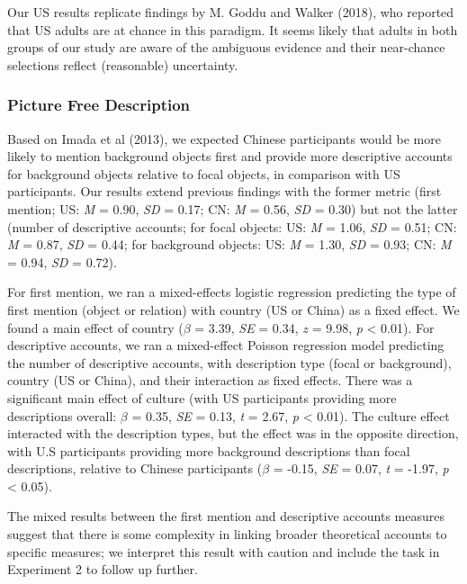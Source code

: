 \documentclass[
  man,floatsintext]{apa6}
\begin{document}
Our US results replicate findings by M. Goddu and Walker (2018), who reported that US adults are at chance in this paradigm. It seems likely that adults in both groups of our study are aware of the ambiguous evidence and their near-chance selections reflect (reasonable) uncertainty.

\hypertarget{picture-free-description-1}{%
\subsubsection{Picture Free Description}\label{picture-free-description-1}}

Based on Imada et al (2013), we expected Chinese participants would be more likely to mention background objects first and provide more descriptive accounts for background objects relative to focal objects, in comparison with US participants. Our results extend previous findings with the former metric (first mention; US: \emph{M} = 0.90, \emph{SD} = 0.17; CN: \emph{M} = 0.56, \emph{SD} = 0.30) but not the latter (number of descriptive accounts; for focal objects: US: \emph{M} = 1.06, \emph{SD} = 0.51; CN: \emph{M} = 0.87, \emph{SD} = 0.44; for background objects: US: \emph{M} = 1.30, \emph{SD} = 0.93; CN: \emph{M} = 0.94, \emph{SD} = 0.72).

For first mention, we ran a mixed-effects logistic regression predicting the type of first mention (object or relation) with country (US or China) as a fixed effect. We found a main effect of country (\(\beta\) = 3.39, \emph{SE} = 0.34, \emph{z} = 9.98, \emph{p} \textless{} 0.01). For descriptive accounts, we ran a mixed-effect Poisson regression model predicting the number of descriptive accounts, with description type (focal or background), country (US or China), and their interaction as fixed effects. There was a significant main effect of culture (with US participants providing more descriptions overall: \(\beta\) = 0.35, \emph{SE} = 0.13, \emph{t} = 2.67, \emph{p} \textless{} 0.01). The culture effect interacted with the description types, but the effect was in the opposite direction, with U.S participants providing more background descriptions than focal descriptions, relative to Chinese participants (\(\beta\) = -0.15, \emph{SE} = 0.07, \emph{t} = -1.97, \emph{p} \textless{} 0.05).

The mixed results between the first mention and descriptive accounts measures suggest that there is some complexity in linking broader theoretical accounts to specific measures; we interpret this result with caution and include the task in Experiment 2 to follow up further.
\end{document}

